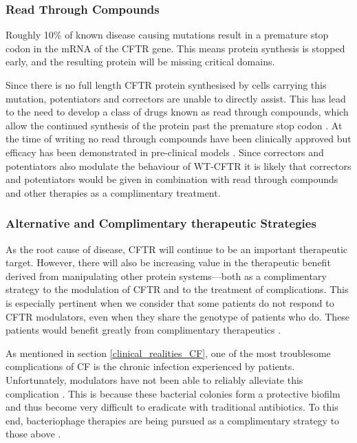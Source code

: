 \subsubsection{Read Through Compounds}
Roughly 10\% of known disease causing mutations result in a premature stop codon in the mRNA of the CFTR gene. This means protein synthesis is stopped early, and the resulting protein will be missing critical domains. 

Since there is no full length CFTR protein synthesised by cells carrying this mutation, potentiators and correctors are unable to directly assist. This has lead to the need to develop a class of drugs known as read through compounds, which allow the continued synthesis of the protein past the premature stop codon \cite{sharma2021}. At the time of writing no read through compounds have been clinically approved but efficacy has been demonstrated in pre-clinical models \cite{crawford2021}. Since correctors and potentiators also modulate the behaviour of WT-CFTR it is likely that correctors and potentiators would be given in combination with read through compounds and other therapies as a complimentary treatment.

\subsubsection{Alternative and Complimentary therapeutic Strategies}
As the root cause of disease, CFTR will continue to be an important therapeutic target. However, there will also be increasing value in the therapeutic benefit derived from manipulating other protein systems---both as a complimentary strategy to the modulation of CFTR and to the treatment of complications. This is especially pertinent when we consider that some patients do not respond to CFTR modulators, even when they share the genotype of patients who do. These patients would benefit greatly from complimentary therapeutics \cite{hanafin2021, robertson2015, lingam2017, seelig2020, barbieri2021a, grebert2019}. 

As mentioned in section \ref{clinical_realities_CF}, one of the most troublesome complications of CF is the chronic infection experienced by patients. Unfortunately, modulators have not been able to reliably alleviate this complication \cite{mallapaty2022}. This is because these bacterial colonies form a protective biofilm and thus become very difficult to eradicate with traditional antibiotics. To this end, bacteriophage therapies are being pursued as a complimentary strategy to those above \cite{ng2021}. 


